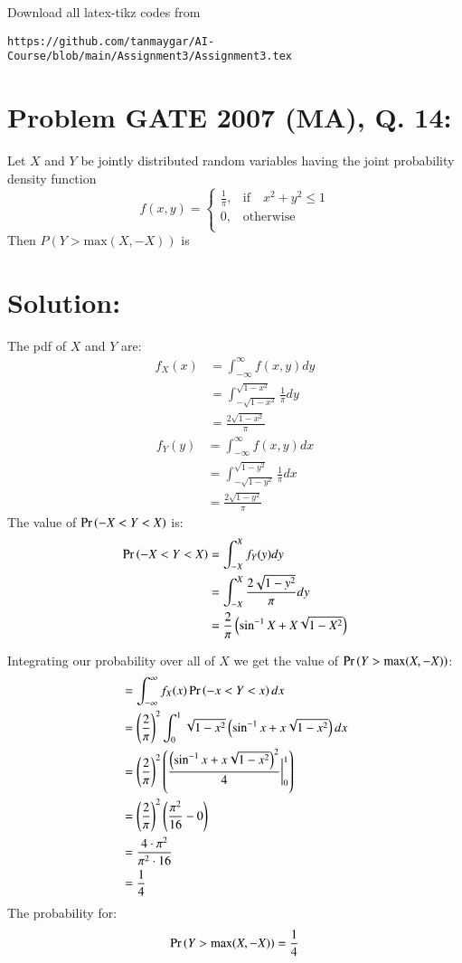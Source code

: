 \documentclass[journal,12pt,twocolumn]{IEEEtran}
\begin{document}
%
Download all latex-tikz codes from 
%
\begin{lstlisting}
https://github.com/tanmaygar/AI-Course/blob/main/Assignment3/Assignment3.tex
\end{lstlisting}

\section*{Problem GATE 2007 (MA), Q. 14: }
Let $X$ and $Y$ be jointly distributed random
variables having the joint probability
density function
\[
f(x,y) = \begin{cases}
            \frac{1}{\pi}, &\text{if}\quad x^2 + y^2 \leq 1\\
             0, &\text{otherwise}\\
            \end{cases}
\]
Then $P(Y > \text{max}(X,-X))$ is

\section*{Solution:}
The pdf of $X$ and $Y$ are:
\begin{align}
    f_X(x)&=\int_{-\infty}^{\infty}f(x,y)dy\\
    &=\int_{-\sqrt{1-x^2}}^{\sqrt{1-x^2}}\frac{1}{\pi}dy\\
    &=\frac{2\sqrt{1-x^2}}{\pi}
\end{align}
\begin{align}
    f_Y(y)&=\int_{-\infty}^{\infty}f(x,y)dx\\
    &=\int_{-\sqrt{1-y^2}}^{\sqrt{1-y^2}}\frac{1}{\pi}dx\\
    &=\frac{2\sqrt{1-y^2}}{\pi}
\end{align}
The value of $\Pr\left(-X<Y<X\right)$ is:
\begin{align}
\nonumber
\Pr\left(-X<Y<X\right) &=\int_{-X}^Xf_Y(y)dy\\
 &=\int_{-X}^X\frac{2\sqrt{1-y^2}}{\pi}dy\\
 &=\frac{2}{\pi}\left(\sin^{-1}{X} + X\sqrt{1-X^2}\right)
\end{align}

Integrating our probability over all of $X$ we get the value of $\Pr\left(Y>\text{max}(X,-X)\right)$:
\begin{align}
 &=\int_{-\infty}^{\infty}f_X(x)\Pr\left(-x<Y<x\right)dx\\
    &=\left(\frac{2}{\pi}\right)^2\int_0^1\sqrt{1-x^2}\left(\sin^{-1}{x} + x\sqrt{1-x^2}\right)dx\\
&=\left(\frac{2}{\pi}\right)^2\left(\frac{\left(\sin^{-1}{x} +x\sqrt{1-x^2}\right)^2}{4} \bigg |_0^1\right)\\
&=\left(\frac{2}{\pi}\right)^2\left(\frac{\pi^2}{16} - 0\right)\\
    &=\frac{4\cdot{\pi}^2}{{\pi}^2\cdot16}\\
    &=\frac{1}{4}
\end{align}
The probability for:
\begin{align}
    \Pr\left(Y>\text{max}(X,-X)\right) = \frac{1}{4}
\end{align}
\end{document}

